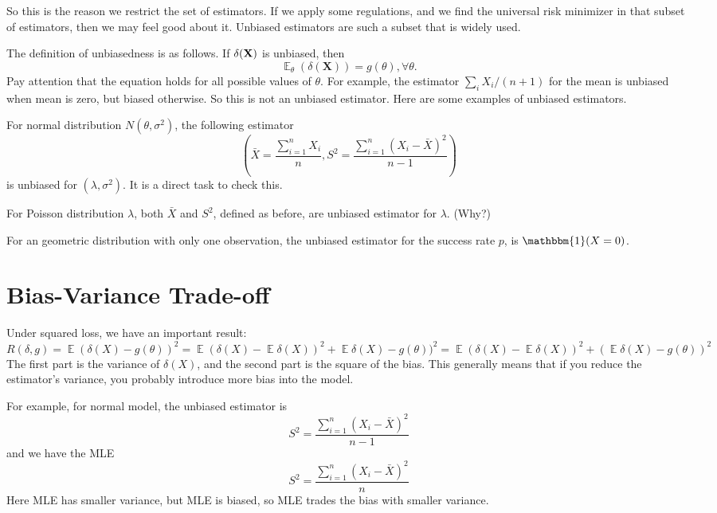 \documentclass[12pt]{article}
\newcommand{\1}{\mathbbm{1}}
\newcommand{\E}{\operatorname{\mathbb{E}}}
\begin{document}
So this is the reason we restrict the set of estimators. If we apply some regulations, and we find the universal risk minimizer in that subset of estimators, then we may feel good about it. Unbiased estimators are such a subset that is widely used.

The definition of unbiasedness is as follows. If $\delta(\bf X)$ is unbiased, then
$$
\E_\theta (\delta(\mathbf{X})) = g(\theta), \forall \theta.
$$
Pay attention that the equation holds for all possible values of $\theta$. For example, the estimator $\sum_i X_i / (n+1)$ for the mean is unbiased when mean is zero, but biased otherwise. So this is not an unbiased estimator. Here are some examples of unbiased estimators.

For normal distribution $N(\theta, \sigma^2)$, the following estimator
$$
(\bar{X} = \frac{\sum_{i = 1}^n X_i}{n} , S^2 = \frac{\sum_{i=1}^n (X_i - \bar{X} )^2 }{n-1})
$$
is unbiased for $(\lambda, \sigma^2)$. It is a direct task to check this.

For Poisson distribution $\lambda$, both $\bar{X}$ and $S^2$, defined as before, are unbiased estimator for $\lambda$. (Why?)

For an geometric distribution with only one observation, the unbiased estimator for the success rate $p$, is $\1 (X = 0)$.

\section{Bias-Variance Trade-off}

Under squared loss, we have an important result:
$$
R(\delta,g) = \E (\delta(X) - g(\theta))^2 = \E (\delta(X) -\E \delta(X))^2 + \E \delta(X) - g(\theta) )^2 = \E (\delta(X) - \E \delta(X))^2 + (\E \delta(X) - g(\theta) )^2
$$
The first part is the variance of $\delta(X)$, and the second part is the square of the bias. This generally means that if you reduce the estimator's variance, you probably introduce more bias into the model.

For example, for normal model, the unbiased estimator is
$$
S^2 = \frac{\sum_{i=1}^n (X_i - \bar{X} )^2 }{n-1}
$$
and we have the MLE
$$
S^2 = \frac{\sum_{i=1}^n (X_i - \bar{X} )^2 }{n}
$$
Here MLE has smaller variance, but MLE is biased, so MLE trades the bias with smaller variance.



\end{document}
